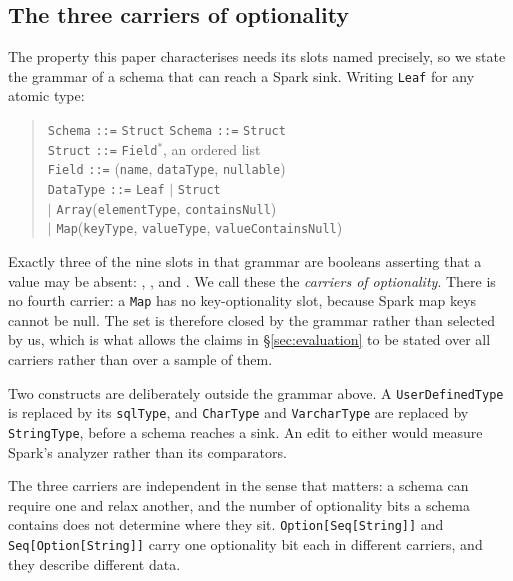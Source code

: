 \subsection{The three carriers of optionality}
\label{sec:carriers}

The property this paper characterises needs its slots named precisely, so we state the grammar of a schema that can reach a Spark sink. Writing \texttt{Leaf} for any atomic type:

\begin{quote}
\begin{tabbing}
\texttt{Schema} \= \texttt{::=} \= \texttt{Struct} \kill
\texttt{Schema} \> \texttt{::=} \> \texttt{Struct} \\
\texttt{Struct} \> \texttt{::=} \> \texttt{Field}$^{*}$, an ordered list \\
\texttt{Field} \> \texttt{::=} \> (\texttt{name}, \texttt{dataType}, \texttt{nullable}) \\
\texttt{DataType} \> \texttt{::=} \> \texttt{Leaf} $\mid$ \texttt{Struct} \\
 \> $\mid$ \> \texttt{Array}(\texttt{elementType}, \texttt{containsNull}) \\
 \> $\mid$ \> \texttt{Map}(\texttt{keyType}, \texttt{valueType}, \texttt{valueContainsNull})
\end{tabbing}
\end{quote}

Exactly three of the nine slots in that grammar are booleans asserting that a value may be absent: , , and . We call these the \emph{carriers of optionality}. There is no fourth carrier: a \texttt{Map} has no key-optionality slot, because Spark map keys cannot be null. The set is therefore closed by the grammar rather than selected by us, which is what allows the claims in \S\ref{sec:evaluation} to be stated over all carriers rather than over a sample of them.

Two constructs are deliberately outside the grammar above. A \texttt{UserDefinedType} is replaced by its \texttt{sqlType}, and \texttt{CharType} and \texttt{VarcharType} are replaced by \texttt{StringType}, before a schema reaches a sink. An edit to either would measure Spark's analyzer rather than its comparators.

The three carriers are independent in the sense that matters: a schema can require one and relax another, and the number of optionality bits a schema contains does not determine where they sit. \texttt{Option[Seq[String]]} and \texttt{Seq[Option[String]]} carry one optionality bit each in different carriers, and they describe different data.

